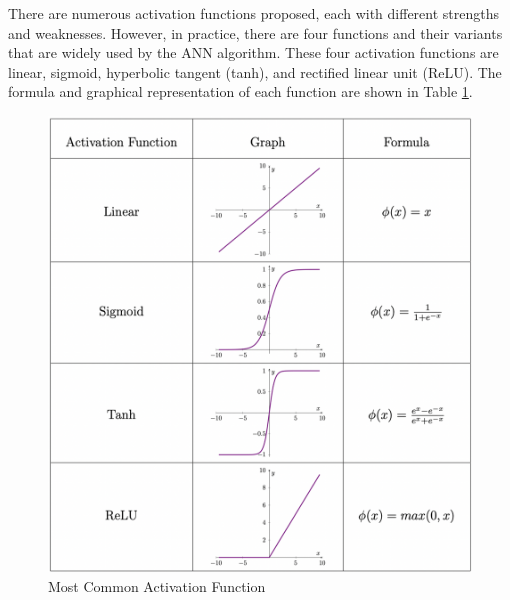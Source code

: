 There are numerous activation functions proposed, each with different strengths and weaknesses. However, in practice, there are four functions and their variants that are widely used by the ANN algorithm. These four activation functions are linear, sigmoid, hyperbolic tangent (tanh), and rectified linear unit (ReLU). The formula and graphical representation of each function are shown in Table \ref{acti_func_table}.

\begin{figure}[!ht]
    \centering
    \includegraphics[width=5in]{figures/acti_func_table.png}
    \caption{Most Common Activation Function}
    \label{acti_func_table}
\end{figure}

